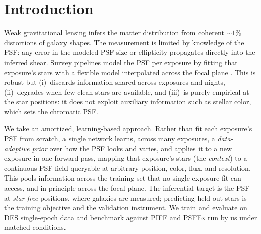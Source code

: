 \documentclass[twocolumn]{aastex701}
\begin{document}

\section{Introduction} \label{sec:intro}

Weak gravitational lensing infers the matter distribution from coherent ${\sim}1\%$
distortions of galaxy shapes. The measurement is limited by knowledge of the PSF: any
error in the modeled PSF size or ellipticity propagates directly into the inferred shear.
Survey pipelines model the PSF per exposure by fitting that exposure's stars with a
flexible model interpolated across the focal plane \citep[\textsc{PSFEx};][]{Bertin2011}
\citep[\textsc{PIFF};][]{Jarvis2021}. This is robust but (i)~discards information shared
across exposures and nights, (ii)~degrades when few clean stars are available, and
(iii)~is purely empirical at the star positions: it does not exploit auxiliary
information such as stellar color, which sets the chromatic PSF.

We take an amortized, learning-based approach. Rather than fit each exposure's PSF from
scratch, a single network learns, across many exposures, a \emph{data-adaptive prior}
over how the PSF looks and varies, and applies it to a new exposure in one forward pass,
mapping that exposure's stars (the \emph{context}) to a continuous PSF field queryable at
arbitrary position, color, flux, and resolution. This pools information across
the training set that no single-exposure fit can access, and in principle across the
focal plane. The inferential target is
the PSF at \emph{star-free} positions, where galaxies are measured; predicting held-out
stars is the training objective and the validation instrument. We train and evaluate on
DES single-epoch data and benchmark against \textsc{PIFF} and \textsc{PSFEx} run by us
under matched conditions.
\end{document}
